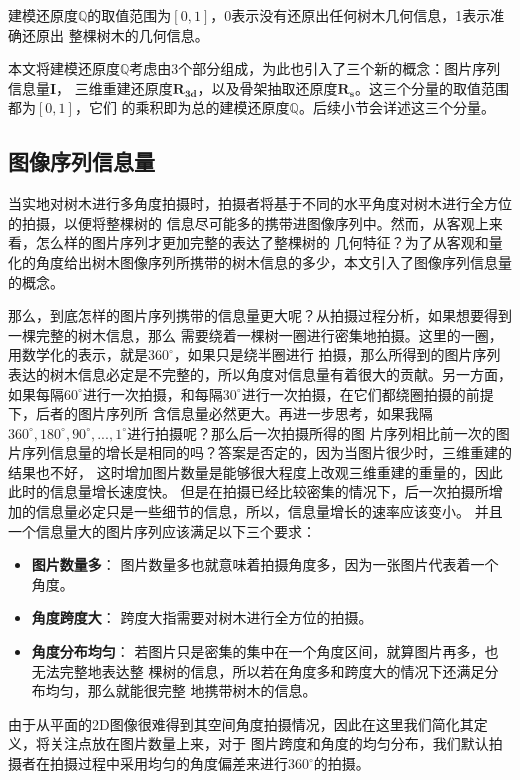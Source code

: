 建模还原度$\mathbb{Q}$的取值范围为$[0,1]$，0表示没有还原出任何树木几何信息，1表示准确还原出
整棵树木的几何信息。

本文将建模还原度$\mathbb{Q}$考虑由3个部分组成，为此也引入了三个新的概念：图片序列信息量$\mathbf{I}$，
三维重建还原度$\mathbf{R_{3d}}$，以及骨架抽取还原度$\mathbf{R_s}$。这三个分量的取值范围都为$[0,1]$，它们
的乘积即为总的建模还原度$\mathbb{Q}$。后续小节会详述这三个分量。

\subsection{图像序列信息量}
当实地对树木进行多角度拍摄时，拍摄者将基于不同的水平角度对树木进行全方位的拍摄，以便将整棵树的
信息尽可能多的携带进图像序列中。然而，从客观上来看，怎么样的图片序列才更加完整的表达了整棵树的
几何特征？为了从客观和量化的角度给出树木图像序列所携带的树木信息的多少，本文引入了图像序列信息量的概念。

那么，到底怎样的图片序列携带的信息量更大呢？从拍摄过程分析，如果想要得到一棵完整的树木信息，那么
需要绕着一棵树一圈进行密集地拍摄。这里的一圈，用数学化的表示，就是$360^\circ$，如果只是绕半圈进行
拍摄，那么所得到的图片序列表达的树木信息必定是不完整的，所以角度对信息量有着很大的贡献。另一方面，
如果每隔$60^\circ$进行一次拍摄，和每隔$30^\circ$进行一次拍摄，在它们都绕圈拍摄的前提下，后者的图片序列所
含信息量必然更大。再进一步思考，如果我隔$360^\circ,180^\circ,90^\circ,..., 1^\circ$进行拍摄呢？那么后一次拍摄所得的图
片序列相比前一次的图片序列信息量的增长是相同的吗？答案是否定的，因为当图片很少时，三维重建的结果也不好，
这时增加图片数量是能够很大程度上改观三维重建的重量的，因此此时的信息量增长速度快。
但是在拍摄已经比较密集的情况下，后一次拍摄所增加的信息量必定只是一些细节的信息，所以，信息量增长的速率应该变小。
并且一个信息量大的图片序列应该满足以下三个要求：\\
\begin{itemize}
	\item \textbf{图片数量多}： 图片数量多也就意味着拍摄角度多，因为一张图片代表着一个角度。
	\item \textbf{角度跨度大}： 跨度大指需要对树木进行全方位的拍摄。
	\item \textbf{角度分布均匀}： 若图片只是密集的集中在一个角度区间，就算图片再多，也无法完整地表达整
								  棵树的信息，所以若在角度多和跨度大的情况下还满足分布均匀，那么就能很完整
								  地携带树木的信息。
\end{itemize}

由于从平面的2D图像很难得到其空间角度拍摄情况，因此在这里我们简化其定义，将关注点放在图片数量上来，对于
图片跨度和角度的均匀分布，我们默认拍摄者在拍摄过程中采用均匀的角度偏差来进行$360^\circ$的拍摄。

